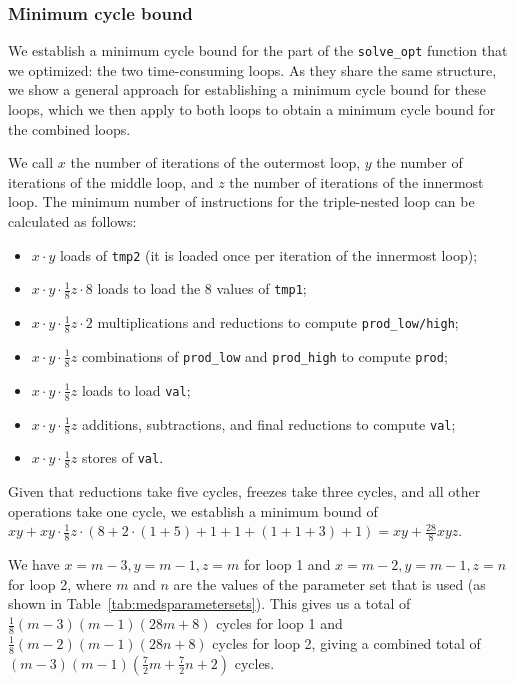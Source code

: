 \documentclass[11pt,a4paper]{report}
\theoremstyle{definition}
\begin{document}
\subsubsection{Minimum cycle bound}
We establish a minimum cycle bound for the part of the \texttt{solve\_opt} function that we optimized: the two time-consuming loops. As they share the same structure, we show a general approach for establishing a minimum cycle bound for these loops, which we then apply to both loops to obtain a minimum cycle bound for the combined loops.

We call $x$ the number of iterations of the outermost loop, $y$ the number of iterations of the middle loop, and $z$ the number of iterations of the innermost loop. The minimum number of instructions for the triple-nested loop can be calculated as follows:
\begin{itemize}
  \item $x \cdot y$ loads of \texttt{tmp2} (it is loaded once per iteration of the innermost loop);
  \item $x \cdot y \cdot \frac{1}{8}z \cdot 8$ loads to load the 8 values of \texttt{tmp1};
  \item $x \cdot y \cdot \frac{1}{8}z \cdot 2$ multiplications and reductions to compute \texttt{prod\_low/high};
  \item $x \cdot y \cdot \frac{1}{8}z$ combinations of \texttt{prod\_low} and \texttt{prod\_high} to compute \texttt{prod};
  \item $x \cdot y \cdot \frac{1}{8}z$ loads to load \texttt{val};
  \item $x \cdot y \cdot \frac{1}{8}z$ additions, subtractions, and final reductions to compute \texttt{val};
  \item $x \cdot y \cdot \frac{1}{8}z$ stores of \texttt{val}.
\end{itemize}
Given that reductions take five cycles, freezes take three cycles, and all other operations take one cycle, we establish a minimum bound of $xy + xy \cdot \frac{1}{8}z \cdot (8 + 2 \cdot (1 + 5) + 1 + 1 + (1 + 1 + 3) + 1) = xy + \frac{28}{8}xyz$.

We have $x = m - 3, y = m - 1, z = m$ for loop 1 and $x = m - 2, y = m - 1, z = n$ for loop 2, where $m$ and $n$ are the values of the parameter set that is used (as shown in Table~\ref{tab:medsparametersets}). This gives us a total of $\frac{1}{8}(m-3)(m-1)(28m + 8)$ cycles for loop 1 and $\frac{1}{8}(m-2)(m-1)(28n + 8)$ cycles for loop 2, giving a combined total of $(m-3)(m-1)\left(\frac{7}{2}m + \frac{7}{2}n + 2\right)$ cycles.
\end{document}
